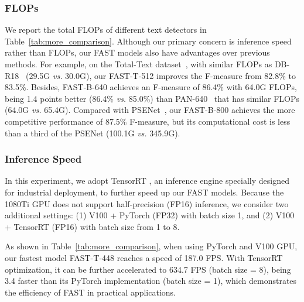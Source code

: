 \documentclass[lettersize,journal]{IEEEtran}
\begin{document}
\subsubsection{FLOPs}
We report the total FLOPs of different text detectors in Table~\ref{tab:more_comparison}. Although our primary concern is inference speed rather than FLOPs, our FAST models also have advantages over previous methods. 
For example, on the Total-Text dataset~\cite{ch2017total}, with similar FLOPs as DB-R18~\cite{liao2020real} (29.5G \emph{vs.} 30.0G), our FAST-T-512 improves the F-measure from 82.8\% to 83.5\%.
Besides,
FAST-B-640 achieves an F-measure of 86.4\% with 64.0G FLOPs, being 1.4 points better (86.4\% \emph{vs.} 85.0\%) than PAN-640~\cite{wang2019efficient} that has similar FLOPs (64.0G \emph{vs.} 65.4G).
Compared with PSENet~\cite{wang2019shape}, our FAST-B-800 achieves the more competitive performance of 87.5\% F-measure, but its computational cost is less than a third of the PSENet (100.1G \emph{vs.} 345.9G).

\subsubsection{Inference Speed}
In this experiment, we adopt TensorRT \cite{vanholder2016efficient}, an inference engine specially designed for industrial deployment, to further speed up our FAST models.
Because the 1080Ti GPU does not support half-precision (FP16) inference, we consider two additional settings: (1) V100 + PyTorch (FP32) with batch size 1, and (2) V100 + TensorRT (FP16) with batch size from 1 to 8. 

As shown in Table~\ref{tab:more_comparison}, when using PyTorch and V100 GPU, our fastest model FAST-T-448 reaches a speed of 187.0 FPS.
With TensorRT optimization, it can be further accelerated to 634.7 FPS (batch size = 8), being 3.4 faster than its PyTorch implementation (batch size = 1), which demonstrates the efficiency of FAST in practical applications.
\end{document}
